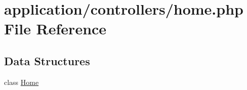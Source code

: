 \hypertarget{controllers_2home_8php}{\section{application/controllers/home.php File Reference}
\label{controllers_2home_8php}
}
\subsection*{Data Structures}
\begin{DoxyCompactItemize}
\item 
class \hyperlink{class_home}{Home}
\end{DoxyCompactItemize}
